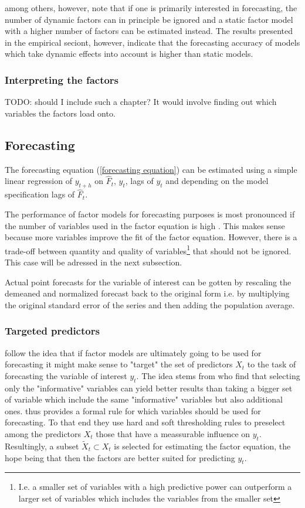 \documentclass[12pt]{article}
\begin{document}
\citet{breitung2011testing} among others, however, note that if one is primarily interested in forecasting, the number of dynamic factors can in principle be ignored and a static factor model with a higher number of factors can be estimated instead. The results presented in the empirical seciont, however, indicate that the forecasting accuracy of models which take dynamic effects into account is higher than static models.

\subsubsection{Interpreting the factors}
TODO: should I include such a chapter? It would involve finding out which variables the factors load onto.


\subsection{Forecasting}
The forecasting equation (\ref{forecasting equation}) can be estimated using a simple linear regression of $y_{t+h}$ on $\hat F_t$, $y_t$, lags of $y_t$ and depending on the model specification lags of $\hat F_t$.

The performance of factor models for forecasting purposes is most pronounced if the number of variables used in the factor equation is high \citep{stock2011dynamic}. This makes sense because more variables improve the fit of the factor equation. However, there is a trade-off between quantity and quality of variables\footnote{I.e. a smaller set of variables with a high predictive power can outperform a larger set of variables which includes the variables from the smaller set} that should not be ignored. This case will be adressed in the next subsection.

Actual point forecasts for the variable of interest can be gotten by rescaling the demeaned and normalized forecast back to the original form i.e. by multiplying the original standard error of the series and then adding the population average.

\subsubsection{Targeted predictors}
\citet{bai2008forecasting} follow the idea that if factor models are ultimately going to be used for forecasting it might make sense to "target" the set of predictors $X_t$ to the task of forecasting the variable of interest $y_t$. The idea stems from \citet{boivin2006more} who find that selecting only the "informative" variables can yield better results than taking a bigger set of variable which include the same "informative" variables but also additional ones. \citet{bai2008forecasting} thus provides a formal rule for which variables should be used for forecasting. To that end they use hard and soft thresholding rules to preselect among the predictors $X_t$ those that have a meassurable influence on $y_t$. Resultingly, a subset $\tilde X_t \subset X_t$ is selected for estimating the factor equation, the hope being that then the factors are better suited for predicting $y_t$.
\end{document}
